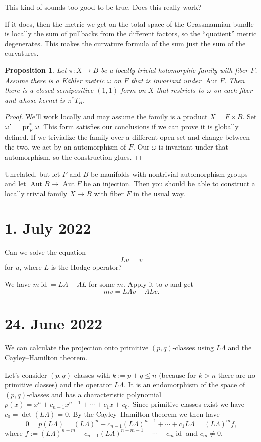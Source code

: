 \documentclass[11pt]{article}
\newtheorem{prop}[theo]{Proposition}
\theoremstyle{definition}
\DeclareMathOperator{\pr}{pr}
\DeclareMathOperator{\Aut}{Aut}
\DeclareMathOperator{\id}{id}
\begin{document}
This kind of sounds too good to be true. Does this really work?

If it does, then the metric we get on the total space of the Grassmannian bundle
is locally the sum of pullbacks from the different factors, so the ``quotient''
metric degenerates. This makes the curvature formula of the sum just the sum of
the curvatures.


\begin{prop}
Let $\pi : X \to B$ be a locally trivial holomorphic family with fiber $F$.
Assume there is a K\"ahler metric $\omega$ on $F$ that is invariant under $\Aut F$.
Then there is a closed semipositive $(1,1)$-form on $X$ that restricts to $\omega$ on each fiber and whose kernel is $\pi^*T_B$.
\end{prop}

\begin{proof}
We'll work locally and may assume the family is a product $X = F \times B$.
Set $\omega' = \pr_{F}^*\omega$.
This form satisfies our conclusions if we can prove it is globally defined.
If we trivialize the family over a different open set and change between the two, we act by an automorphism of $F$.
Our $\omega$ is invariant under that automorphism, so the construction glues.
\end{proof}


Unrelated, but let $F$ and $B$ be manifolds with nontrivial automorphism groups
and let $\Aut B \to \Aut F$ be an injection. Then you should be able to
construct a locally trivial family $X \to B$ with fiber $F$ in the usual way.


\section*{1. July 2022}

Can we solve the equation
\[
  Lu = v
\]
for $u$, where $L$ is the Hodge operator?

We have $m \id = L\Lambda - \Lambda L$ for some $m$. Apply it to $v$ and get
\[
  m v = L \Lambda v - \Lambda L v.
\]

\section*{24. June 2022}


We can calculate the projection onto primitive $(p,q)$-classes using $L\Lambda$ and the Cayley--Hamilton theorem.

Let's consider $(p,q)$-classes with $k := p + q \leq n$ (because for $k > n$ there are no primitive classes) and the operator $L\Lambda$. It is an endomorphism of the space of $(p,q)$-classes and has a characteristic polynomial $p(x) = x^n + c_{n-1}x^{n-1} + \cdots + c_1 x + c_0$. Since primitive classes exist we have $c_0 = \det (L\Lambda) = 0$. By the Cayley--Hamilton theorem we then have
$$
0 = p(L\Lambda)
= (L\Lambda)^n + c_{n-1}(L\Lambda)^{n-1} + \cdots + c_1 L\Lambda
= (L\Lambda)^m f,
$$
where $f := (L\Lambda)^{n-m} + c_{n-1} (L\Lambda)^{n-m-1} + \cdots + c_m \operatorname{id}$ and $c_m \not= 0$.
\end{document}
